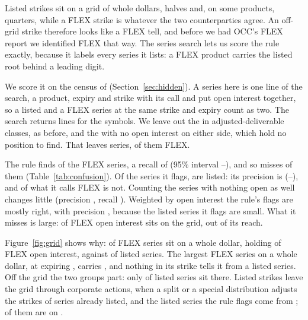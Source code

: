 \documentclass[11pt]{article}
\begin{document}
Listed strikes sit on a grid of whole dollars, halves and, on some products, quarters,
while a FLEX strike is whatever the two counterparties agree. An off-grid strike
therefore looks like a FLEX tell, and before we had OCC's FLEX report we identified FLEX
that way. The series search lets us score the rule exactly, because it labels every
series it lists: a FLEX product carries the listed root behind a leading digit.

We score it on the census of \HiddenCensusDate{} (Section~\ref{sec:hidden}). A series
here is one line of the search, a product, expiry and strike with its call and put open
interest together, so a listed and a FLEX series at the same strike and expiry count as
two. The search returns \CensusRows{} lines for the \HiddenCensusSymbols{} symbols. We
leave out the \CensusAdjustedSeries{} in adjusted-deliverable classes, as before, and the
\CensusEmptySeries{} with no open interest on either side, which hold no position to
find. That leaves \CensusSeries{} series, \CensusFlexSeries{} of them FLEX.



The rule finds \RuleFlexFound{} of the \CensusFlexSeries{} FLEX series, a recall of
\RuleRecall{} (95\% interval \RuleRecallLow{}--\RuleRecallHigh{}), and so misses
\FlexOnGridShare{} of them (Table~\ref{tab:confusion}). Of the series it flags,
\RuleListedFlagged{} are listed: its precision is \RulePrecision{}
(\RulePrecisionLow{}--\RulePrecisionHigh{}),
and \RuleFalseShare{} of what it calls FLEX is not. Counting the series with nothing open
as well changes little (precision \RulePrecisionWithEmpty{}, recall
\RuleRecallWithEmpty{}). Weighted by open interest the rule's flags are mostly right,
with precision \RulePrecisionOpenInterest{}, because the listed series it flags are
small. What it misses is large: \FlexOnGridOpenInterest{} of FLEX open interest sits on
the grid, out of its reach.

Figure~\ref{fig:grid} shows why: \FlexDollarShare{} of FLEX series sit on a whole dollar,
holding \FlexDollarOpenInterest{} of FLEX open interest, against \ListedDollarShare{} of
listed series. The largest FLEX series on a whole dollar, \RuleExampleProduct{} at
\RuleExampleStrike{} expiring \RuleExampleExpiry{}, carries \RuleExampleOpenInterest{},
and nothing in its strike tells it from a listed series. Off the grid the two groups
part: only \ListedOffGridShare{} of listed series sit there. Listed strikes leave the grid
through corporate actions, when a split or a special distribution adjusts the strikes of
series already listed, and the listed series the rule flags come from
\RuleListedFlaggedUnderlyings{}; \RuleListedFlaggedTopShare{} of them are on
\RuleListedFlaggedTopNames{}.
\end{document}
